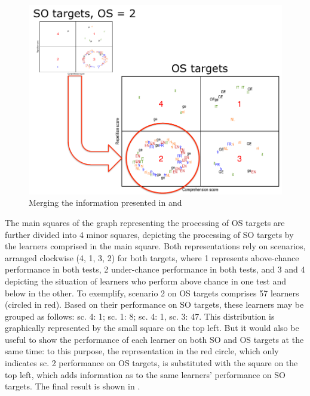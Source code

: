 \begin{figure}
    \includegraphics[width=\textwidth]{figures/06-4.pdf}
    \caption{Merging the information presented in  and }
    \label{fig:06:4}
\end{figure}

The main squares of the graph representing the processing of OS targets are further divided into 4 minor squares, depicting the processing of SO targets by the learners comprised in the main square. Both representations rely on scenarios, arranged clockwise (4, 1, 3, 2) for both targets, where 1 represents above-chance performance in both tests, 2 under-chance performance in both tests, and 3 and 4 depicting the situation of learners who perform above chance in one test and below in the other. To exemplify, scenario 2 on OS targets comprises 57 learners (circled in red). Based on their performance on SO targets, these learners may be grouped as follows: sc. 4: 1; sc. 1: 8; sc. 4: 1, sc. 3: 47. This distribution is graphically represented by the small square on the top left. But it would also be useful to show the performance of each learner on both SO and OS targets at the same time: to this purpose, the representation in the red circle, which only indicates sc. 2 performance on OS targets, is substituted with the square on the top left, which adds information as to the same learners’ performance on SO targets. The final result is shown in .

